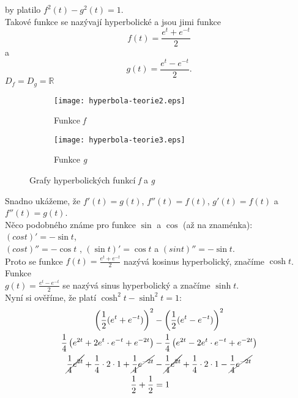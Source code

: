 			by platilo $f^2(t)-g^2(t)=1$. \\[10pt]
			Takové funkce se nazývají hyperbolické a jsou jimi funkce
			$$f(t)=\frac{e^t+e^{-t}}{2}$$
			a
			$$g(t)=\frac{e^t-e^{-t}}{2}.$$
			$D_f=D_g=\mathbb{R}$
			\begin{figure}[H]
				\centering
				\begin{subfigure}{0.5\textwidth}
					\centering
					\texttt{[image: hyperbola-teorie2.eps]}
					\caption{Funkce \textit{f}}
				\end{subfigure}%
				\begin{subfigure}{0.5\textwidth}
					\centering
					\texttt{[image: hyperbola-teorie3.eps]}
					\caption{Funkce \textit{g}}
				\end{subfigure}
				\caption{Grafy hyperbolických funkcí \textit{f} a \textit{g}}
			\end{figure}
			\noindent Snadno ukážeme, že $f'(t)=g(t)$, $f''(t)=f(t)$, $g'(t)=f(t)$ a $f''(t)=g(t)$. \\[10pt]
			Něco podobného známe pro funkce  $\sin$ a $\cos$ (až na znaménka): $(cos{t})'=-\sin{t}$,\\ $(cos{t})''=-\cos{t}$
			, $(\sin{t})'=\cos{t}$ a $(sin{t})''=-\sin{t}$. \\[10pt]
			Proto se funkce $f(t)=\frac{e^t+e^{-t}}{2}$ nazývá  kosinus hyperbolický, značíme $\cosh{t}$. Funkce \\ $g(t)=\frac{e^t-e^{-t}}{2}$
			se nazývá sinus hyperbolický a značíme $\sinh{t}$. \\[10pt]
			Nyní si ověříme, že platí $\cosh^2{t}-\sinh^2{t}=1$:
			\begin{align*}
				\left(\frac{1}{2}(e^t+e^{-t})\right)^2                                             & - \left(\frac{1}{2}(e^t-e^{-t})\right)^2                                             \\
				\frac{1}{4} \left(e^{2t} + 2 e^t \cdot e^{-t} + e^{-2t}\right)                     & - \frac{1}{4} \left(e^{2t} - 2 e^t \cdot e^{-t} + e^{-2t}\right)                     \\
				\cancel{\frac{1}{4}e^{2t}}+\frac{1}{4} \cdot 2\cdot1 + \cancel{\frac{1}{4}e^{-2t}} & - \cancel{\frac{1}{4}e^{2t}}+\frac{1}{4} \cdot 2 \cdot 1-\cancel{\frac{1}{4}e^{-2t}} \\
				\frac{1}{2}+\frac{1}{2}                                                            & = 1                                                                                  
			\end{align*}
